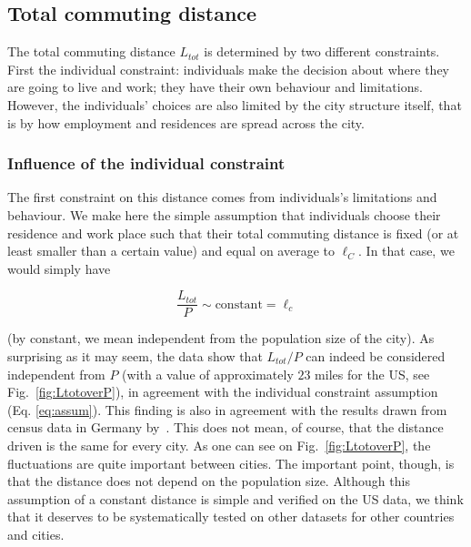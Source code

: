 \subsection{Total commuting distance}
\label{sec:total_length_driven}

The total commuting distance $L_{tot}$ is determined by two different
constraints. First the individual constraint: individuals make the decision
about where they are going to live and work; they have their own behaviour and
limitations.  However, the individuals' choices are also limited by the city
structure itself, that is by how employment and residences are spread across the
city.



\subsubsection{Influence of the individual constraint} 

The first constraint on this distance comes from individuals's limitations and
behaviour. We make here the simple assumption that individuals choose their
residence and work place such that their total commuting distance is fixed (or
at least smaller than a certain value) and equal on average to $\ell_C$. In that
case, we would simply have

\begin{equation} 
    \frac{L_{tot}}{P} \sim \text{constant} = \ell_c 
    \label{eq:assum}
\end{equation}

(by constant, we mean independent from the population size of the city). As
surprising as it may seem, the data show that $L_{tot}/P$ can indeed be considered
 independent from $P$ (with a value of approximately $23$ miles for
the US, see Fig.~\ref{fig:LtotoverP}), in agreement with the individual
constraint assumption (Eq. \ref{eq:assum}). This finding is also in agreement
with the results drawn from census data in Germany by~\cite{Wilkerson:2014}.
This does not mean, of course, that the distance driven is the same for every
city. As one can see on Fig.~\ref{fig:LtotoverP}, the fluctuations are quite
important between cities. The important point, though, is that the distance does not depend on the population size.
Although this assumption of a constant distance is simple and verified on the US
data, we think that it deserves to be systematically tested on other datasets
for other countries and cities. 

